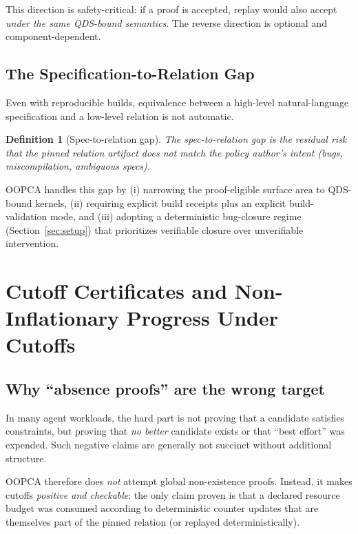 \documentclass[11pt]{article}
\newtheorem{definition}{Definition}
\begin{document}
This direction is safety-critical: if a proof is accepted, replay would also accept \emph{under the same QDS-bound semantics}. The reverse direction is optional and component-dependent.

\subsection{The Specification-to-Relation Gap}

Even with reproducible builds, equivalence between a high-level natural-language specification and a low-level relation is not automatic.

\begin{definition}[Spec-to-relation gap]
The spec-to-relation gap is the residual risk that the pinned relation artifact does not match the policy author's intent (bugs, miscompilation, ambiguous specs).
\end{definition}

OOPCA handles this gap by (i) narrowing the proof-eligible surface area to QDS-bound kernels, (ii) requiring explicit build receipts plus an explicit build-validation mode, and (iii) adopting a deterministic bug-closure regime (Section~\ref{sec:setup}) that prioritizes verifiable closure over unverifiable intervention.

\section{Cutoff Certificates and Non-Inflationary Progress Under Cutoffs}\label{sec:cutoff}

\subsection{Why ``absence proofs'' are the wrong target}

In many agent workloads, the hard part is not proving that a candidate satisfies constraints, but proving that \emph{no better} candidate exists or that ``best effort'' was expended. Such negative claims are generally not succinct without additional structure.

OOPCA therefore does \emph{not} attempt global non-existence proofs. Instead, it makes cutoffs \emph{positive and checkable}: the only claim proven is that a declared resource budget was consumed according to deterministic counter updates that are themselves part of the pinned relation (or replayed deterministically).
\end{document}

